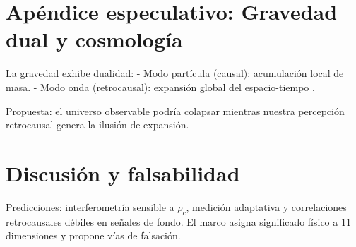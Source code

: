 \documentclass[reprint,amsmath,amssymb,aps]{revtex4-2}
\begin{document}
\section{Apéndice especulativo: Gravedad dual y cosmología}
La gravedad exhibe dualidad:  
- Modo partícula (causal): acumulación local de masa.  
- Modo onda (retrocausal): expansión global del espacio-tiempo \cite{Carroll2010}.  

Propuesta: el universo observable podría colapsar mientras nuestra percepción retrocausal genera la ilusión de expansión.

\section{Discusión y falsabilidad}
Predicciones: interferometría sensible a $\rho_c$, medición adaptativa y correlaciones retrocausales débiles en señales de fondo. El marco asigna significado físico a 11 dimensiones y propone vías de falsación.



\end{document}
